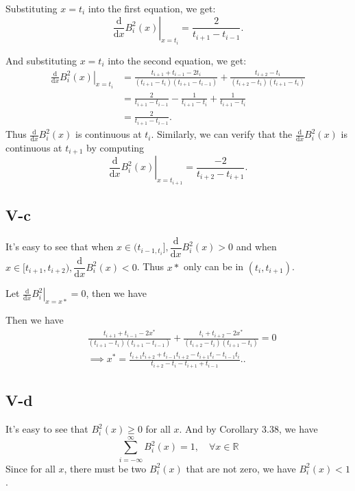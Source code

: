\documentclass[a4paper]{article}
\begin{document}
Substituting $x = t_i$ into the first equation, we get:
\[
\left. \frac{\text{d}}{\text{d}x} B_i^2(x) \right|_{x=t_i} = \frac{2}{t_{i+1} - t_{i-1}}.
\]

And substituting $x = t_{i}$ into the second equation, we get:
\begin{align*}
  \left. \frac{\text{d}}{\text{d}x} B_i^2(x) \right|_{x=t_i} &=     \frac{t_{i+1} + t_{i-1} -2t_i}{(t_{i+1}- t_i)(t_{i+1}-t_{i-1})} + \frac{t_{i+2}  - t_i}{(t_{i+2}-t_i)(t_{i+1} - t_i)} \\
  &= \frac{2}{t_{i+1} - t_{i-1}}-\frac{1}{t_{i+1} - t_i} + \frac{1}{t_{i+1} - t_i}\\
  &= \frac{2}{t_{i+1} - t_{i-1}}.
\end{align*}
Thus $\frac{\text{d}}{\text{d}x}B_i^2(x)$ is continuous at $t_i$.
Similarly, we can verify that the $\frac{\text{d}}{\text{d}x}B_i^2(x)$ is continuous at $t_{i+1}$ by computing 
\[
\left. \frac{\text{d}}{\text{d}x} B_i^2(x) \right|_{x=t_{i+1}} = \frac{-2}{t_{i+2} - t_{i+1}}.
\]

\subsection*{V-c}
It's easy to see that when $x \in (t_{i-1,t_i}], \dfrac{\text{d}}{\text{d}x} B_i^2(x) > 0$ and when $x \in [t_{i+1},t_{i+2}), \dfrac{\text{d}}{\text{d}x} B_i^2(x) < 0$. Thus $x*$ only can be in $(t_{i},t_{i+1})$.

Let $\left. \frac{\text{d}}{\text{d}x} B_i^2 \right|_{x=x*} = 0$, then we have

Then we have 
\begin{align*}
    &\frac{t_{i+1} + t_{i-1} -2x^*}{(t_{i+1}- t_i)(t_{i+1}-t_{i-1})} + \frac{t_{i} + t_{i+2}  -2 x^*}{(t_{i+2}-t_i)(t_{i+1} - t_i)}  = 0\\
    &\implies x^* = \frac{t_{i+1} t_{i+2} + t_{i-1} t_{i+2} - t_{i+1} t_i - t_{i-1} t_i}{t_{i+2} - t_i - t_{i+1} + t_{i-1}}.    .
\end{align*}

\subsection*{V-d}
It's easy to see that $B_i^2(x) \geq 0$ for all $x$. And by Corollary 3.38, we have 
$$\sum_{i=-\infty}^{\infty} B_i^2(x) = 1, \quad\forall  x\in \mathbb{R}$$
Since for all $x$, there must be two $B_i^2(x)$ that are not zero, we have $B_i^2(x)<1$.
\end{document}
